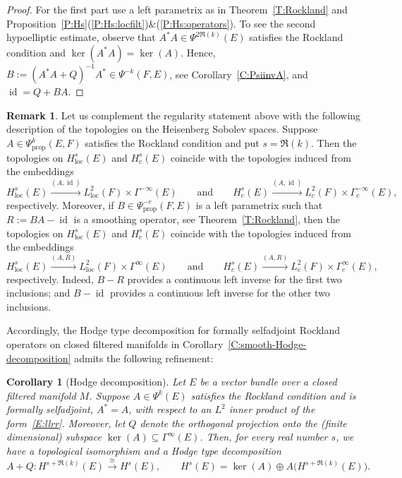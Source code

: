 \documentclass[reqno,12pt]{amsart}
\DeclareMathOperator{\id}{id}
\newcommand\prop{\textrm{prop}}
\newcommand\loc{\textrm{loc}}
\newcommand\itemref[1]{(\ref{#1})}
\theoremstyle{plain}
\newtheorem{corollary}[theorem]{Corollary}
\theoremstyle{definition}
\newtheorem{remark}[theorem]{Remark}
\begin{document}
\begin{proof}
For the first part use a left parametrix as in Theorem~\ref{T:Rockland} and Proposition~\ref{P:Hs}\itemref{P:Hs:locfilt}\&\itemref{P:Hs:operators}.
To see the second hypoelliptic estimate, observe that $A^*A\in\Psi^{2\Re(k)}(E)$ satisfies the Rockland condition and $\ker(A^*A)=\ker(A)$.
Hence, $B:=(A^*A+Q)^{-1}A^*\in\Psi^{-k}(F,E)$, see Corollary~\ref{C:PsiinvA}, and $\id=Q+BA$.
\end{proof}


\begin{remark}
Let us complement the regularity statement above with the following description of the topologies on the Heisenberg Sobolev spaces.
Suppose $A\in\Psi^k_\prop(E,F)$ satisfies the Rockland condition and put $s=\Re(k)$.
Then the topologies on $H^s_\loc(E)$ and $H^s_c(E)$ coincide with the topologies induced from the embeddings
$$
H^s_\loc(E)\xrightarrow{(A,\id)}L^2_\loc(F)\times\Gamma^{-\infty}(E)
\qquad\text{and}\qquad
H^s_c(E)\xrightarrow{(A,\id)}L^2_c(F)\times\Gamma^{-\infty}_c(E),
$$
respectively.
Moreover, if $B\in\Psi^{-r}_\prop(F,E)$ is a left parametrix such that $R:=BA-\id$ is a smoothing operator, see Theorem~\ref{T:Rockland}, then the topologies on $H^s_\loc(E)$ and $H^s_c(E)$ coincide with the topologies induced from the embeddings
$$
H^s_\loc(E)\xrightarrow{(A,R)}L^2_\loc(F)\times\Gamma^\infty(E)
\qquad\text{and}\qquad
H^s_c(E)\xrightarrow{(A,R)}L^2_c(F)\times\Gamma^\infty_c(E),
$$
respectively.
Indeed, $B-R$ provides a continuous left inverse for the first two inclusions; and $B-\id$ provides a continuous left inverse for the other two inclusions.
\end{remark}


Accordingly, the Hodge type decomposition for formally selfadjoint Rockland operators on closed filtered manifolds in Corollary~\ref{C:smooth-Hodge-decomposition} admits the following refinement:


\begin{corollary}[Hodge decomposition]\label{C:HsHodge}
Let $E$ be a vector bundle over a closed filtered manifold $M$.
Suppose $A\in\Psi^k(E)$ satisfies the Rockland condition and is formally selfadjoint, $A^*=A$, with respect to an $L^2$ inner product of the form~\eqref{E:llrr}.
Moreover, let $Q$ denote the orthogonal projection onto the (finite dimensional) subspace $\ker(A)\subseteq\Gamma^\infty(E)$.
Then, for every real number $s$, we have a topological isomorphism and a Hodge type decomposition
$$
A+Q\colon H^{s+\Re(k)}(E)\xrightarrow\cong H^s(E),
\qquad H^s(E)=\ker(A)\oplus A\bigl(H^{s+\Re(k)}(E)\bigr).
$$
\end{corollary}
\end{document}
